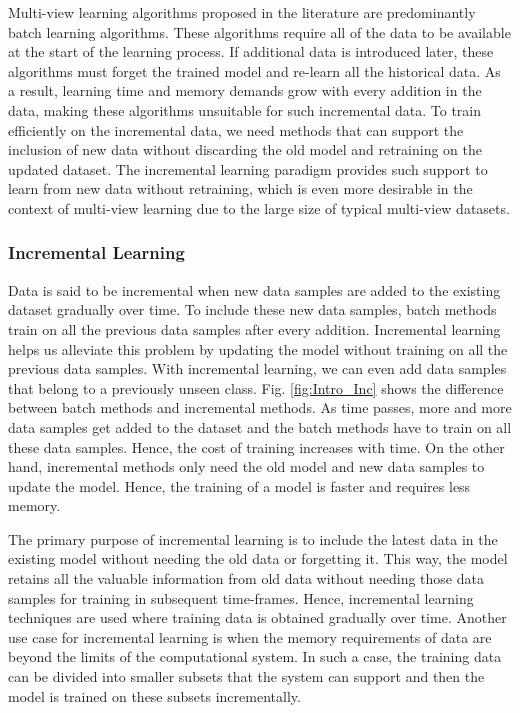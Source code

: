 Multi-view learning algorithms proposed in the literature are predominantly batch learning algorithms. These algorithms require all of the data to be available at the start of the learning process. If additional data is introduced later, these algorithms must forget the trained model and re-learn all the historical data. As a result, learning time and memory demands grow with every addition in the data, making these algorithms unsuitable for such incremental data. To train efficiently on the incremental data, we need methods that can support the inclusion of new data without discarding the old model and retraining on the updated dataset. The incremental learning paradigm provides such support to learn from new data without retraining, which is even more desirable in the context of multi-view learning due to the large size of typical multi-view datasets.









\subsubsection*{Incremental Learning}
\label{ssubs:Intro_Inc}
Data is said to be incremental when new data samples are added to the existing dataset gradually over time. To include these new data samples, batch methods train on all the previous data samples after every addition. Incremental learning helps us alleviate this problem by updating the model without training on all the previous data samples. With incremental learning, we can even add data samples that belong to a previously unseen class. Fig. \ref{fig:Intro_Inc} shows the difference between batch methods and incremental methods. As time passes, more and more data samples get added to the dataset and the batch methods have to train on all these data samples. Hence, the cost of training increases with time. On the other hand, incremental methods only need the old model and new data samples to update the model. Hence, the training of a model is faster and requires less memory.

The primary purpose of incremental learning is to include the latest data in the existing model without needing the old data or forgetting it. This way, the model retains all the valuable information from old data without needing those data samples for training in subsequent time-frames. Hence, incremental learning techniques are used where training data is obtained gradually over time. Another use case for incremental learning is when the memory requirements of data are beyond the limits of the computational system. In such a case, the training data can be divided into smaller subsets that the system can support and then the model is trained on these subsets incrementally.


